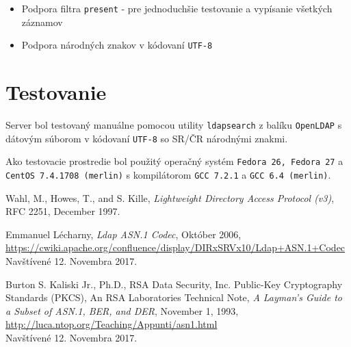 \documentclass[12pt]{report}
\begin{document}
\begin{itemize}
    \item Podpora filtra \texttt{present} - pre jednoduchšie testovanie a vypísanie všetkých záznamov
    \item Podpora národných znakov v kódovaní \texttt{UTF-8}
\end{itemize}

\chapter{Testovanie}

Server bol testovaný manuálne pomocou utility \texttt{ldapsearch} z balíku \texttt{OpenLDAP}
s dátovým súborom v kódovaní \texttt{UTF-8} so SR/ČR národnými znakmi.

Ako testovacie prostredie bol použitý operačný systém \texttt{Fedora 26, Fedora 27} a
\texttt{CentOS 7.4.1708 (merlin)} s kompilátorom \texttt{GCC 7.2.1} a \texttt{GCC 6.4 (merlin)}.

\begin{thebibliography}{9}

        Wahl, M., Howes, T., and S. Kille,
        \textit{Lightweight Directory Access Protocol (v3)},
        RFC 2251,
        December 1997.

        Emmanuel Lécharny,
        \textit{Ldap ASN.1 Codec},
        Október 2006,
        \\\url{https://cwiki.apache.org/confluence/display/DIRxSRVx10/Ldap+ASN.1+Codec}
        \\Navštívené 12. Novembra 2017.

        Burton S. Kaliski Jr., Ph.D.,
        RSA Data Security, Inc. Public-Key Cryptography Standards (PKCS),
        An RSA Laboratories Technical Note,
        \textit{A Layman's Guide to a Subset of ASN.1, BER, and DER},
        November 1, 1993,
        \\\url{http://luca.ntop.org/Teaching/Appunti/asn1.html}
        \\Navštívené 12. Novembra 2017.

\end{thebibliography}
\end{document}
